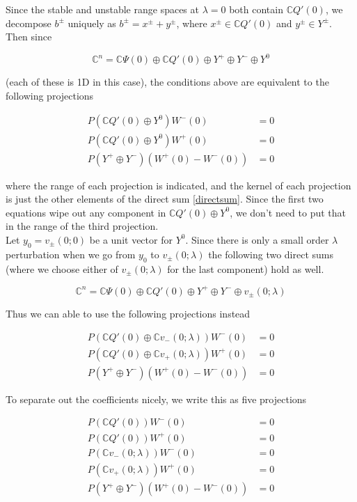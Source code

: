 \documentclass[12pt]{article}
\def\C{{\mathbb C}}
\begin{document}
Since the stable and unstable range spaces at $\lambda = 0$ both contain $\C Q'(0)$, we decompose $b^\pm$ uniquely as $b^\pm = x^\pm + y^\pm$, where $x^\pm \in \C Q'(0)$ and $y^\pm \in Y^\pm$. Then since

\begin{equation}\label{directsum}
\C^n = \C\Psi(0) \oplus \C Q'(0) \oplus Y^+ \oplus Y^- \oplus Y^0
\end{equation}

(each of these is 1D in this case), the conditions above are equivalent to the following projections

\begin{align*}
P(\C Q'(0) \oplus Y^0 )W^-(0) &= 0 \\
P(\C Q'(0) \oplus Y^0 )W^+(0) &= 0 \\
P(Y^+ \oplus Y^-) (W^+(0) - W^-(0) ) &= 0
\end{align*}

where the range of each projection is indicated, and the kernel of each projection is just the other elements of the direct sum \eqref{directsum}. Since the first two equations wipe out any component in $\C Q'(0) \oplus Y^0$, we don't need to put that in the range of the third projection. \\

Let $y_0 = v_\pm(0; 0)$ be a unit vector for $Y^0$. Since there is only a small order $\lambda$ perturbation when we go from $y_0$ to $v_\pm(0; \lambda)$ the following two direct sums (where we choose either of $v_\pm(0; \lambda)$ for the last component) hold as well.

\begin{equation}\label{directsum2}
\C^n = \C\Psi(0) \oplus \C Q'(0) \oplus Y^+ \oplus Y^- \oplus v_\pm(0; \lambda)
\end{equation}

Thus we can able to use the following projections instead

\begin{align*}
P(\C Q'(0) \oplus \C v_-(0; \lambda) )W^-(0) &= 0 \\
P(\C Q'(0) \oplus \C v_+(0; \lambda) )W^+(0) &= 0 \\
P(Y^+ \oplus Y^-) (W^+(0) - W^-(0) ) &= 0
\end{align*}

To separate out the coefficients nicely, we write this as five projections

\begin{align*}
P(\C Q'(0) )W^-(0) &= 0 \\
P(\C Q'(0) )W^+(0) &= 0 \\
P(\C v_-(0; \lambda))W^-(0) &= 0 \\
P(\C v_+(0; \lambda))W^+(0) &= 0 \\
P(Y^+ \oplus Y^-) (W^+(0) - W^-(0) ) &= 0
\end{align*}
\end{document}
